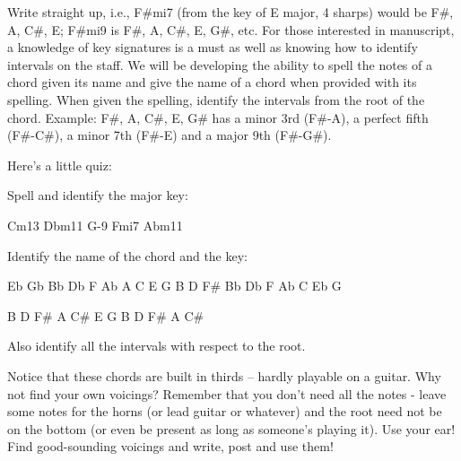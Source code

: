 Write straight up, i.e., F\#mi7 (from the key of E major, 4 sharps) would be
F\#, A, C\#, E; F\#mi9 is F\#, A, C\#, E, G\#, etc. For those interested in
manuscript, a knowledge of key signatures is a must as well as knowing how
to identify intervals on the staff. We will be developing the ability to
spell the notes of a chord given its name and give the name of a chord when
provided with its spelling. When given the spelling, identify the intervals
from the root of the chord. Example: F\#, A, C\#, E, G\# has a minor 3rd (F\#-A),
a perfect fifth (F\#-C\#), a minor 7th (F\#-E) and a major 9th (F\#-G\#).

Here's a little quiz:

Spell and identify the major key:

Cm13   Dbm11   G-9   Fmi7   Abm11

Identify the name of the chord and the key:

Eb Gb Bb Db F Ab       A C E G B D F\#      Bb Db F Ab C Eb G

B D F\# A C\#          E G B D F\# A C\#

Also identify all the intervals with respect to the root.

Notice that these chords are built in thirds -- hardly playable on a guitar.
Why not find your own voicings? Remember that you don't need all the notes -
leave some notes for the horns (or lead guitar or whatever) and the root
need not be on the bottom (or even be present as long as someone's playing
it). Use your ear! Find good-sounding voicings and write, post and use them!
